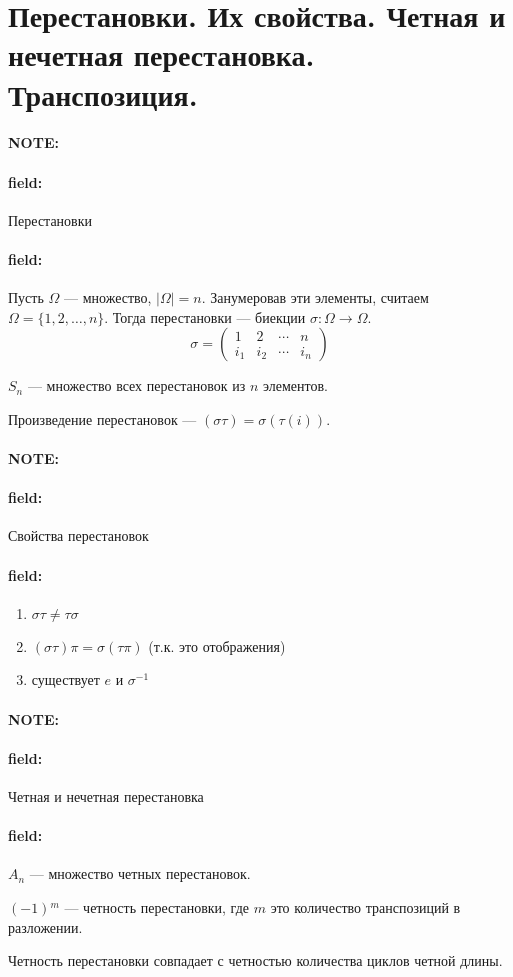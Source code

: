 \documentclass[12pt]{article}
\newenvironment{note}{\paragraph{NOTE:}}{}
\newenvironment{field}{\paragraph{field:}}{}
\begin{document}
\section{Перестановки. Их свойства. Четная и нечетная перестановка.
Транспозиция.}

\begin{note}

  \begin{field}
    Перестановки
  \end{field}

  \begin{field}
    Пусть $\Omega$ --- множество, $|\Omega| = n$. Занумеровав эти элементы,
    считаем $\Omega = \{1, 2, \ldots, n\}$. Тогда перестановки --- биекции
    $\sigma : \Omega \rightarrow \Omega$.
    \begin{equation*}
      \sigma = \begin{pmatrix}
                 1 & 2 & \cdots & n \\
                 i_{1} & i_{2} & \cdots & i_{n}
               \end{pmatrix}
    \end{equation*}

    $S_{n}$ --- множество всех перестановок из $n$ элементов.

    Произведение перестановок --- $(\sigma \tau) = \sigma(\tau(i))$.
  \end{field}
\end{note}

\begin{note}
  \begin{field}
    Свойства перестановок
  \end{field}
  \begin{field}
    \begin{enumerate}
      \item
      $\sigma \tau \neq \tau \sigma$
      \item
      $(\sigma \tau) \pi = \sigma (\tau \pi)$ (т.к. это отображения)
      \item
      существует $e$ и $\sigma^{-1}$
    \end{enumerate}
  \end{field}
\end{note}

\begin{note}
  \begin{field}
    Четная и нечетная перестановка
  \end{field}
  \begin{field}
    $A_{n}$ --- множество четных перестановок.

    $(-1){}^{m}$ --- четность перестановки, где $m$ это количество транспозиций в
    разложении.

    Четность перестановки совпадает с четностью количества циклов четной длины.
  \end{field}
\end{note}
\end{document}
